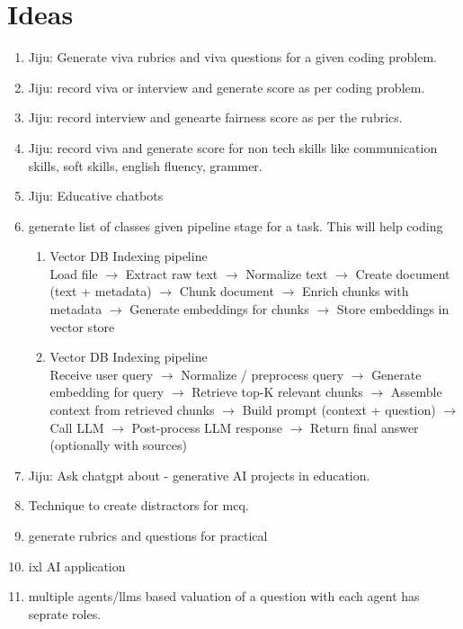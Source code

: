 \section{Ideas}
    \begin{enumerate}
        \item Jiju: Generate viva rubrics and viva questions for a given coding problem.
        \item Jiju: record viva or interview and generate score as per coding problem.
        \item Jiju: record interview and genearte fairness score as per the rubrics.
        \item Jiju: record viva and generate score for non tech skills like communication skills, soft skills, english fluency, grammer.
        \item Jiju: Educative chatbots
        \item generate list of classes given pipeline stage for a task. This will help coding
        \begin{enumerate}
            \item Vector DB Indexing pipeline\\
            Load file $\rightarrow$  Extract raw text $\rightarrow$  Normalize text $\rightarrow$  Create document (text + metadata) $\rightarrow$  Chunk document $\rightarrow$  Enrich chunks with metadata $\rightarrow$  Generate embeddings for chunks $\rightarrow$  Store embeddings in vector store 
            \item Vector DB Indexing pipeline\\
            Receive user query $\rightarrow$ Normalize / preprocess query $\rightarrow$ Generate embedding for query $\rightarrow$ Retrieve top-K relevant chunks $\rightarrow$ Assemble context from retrieved chunks $\rightarrow$ Build prompt (context + question) $\rightarrow$ Call LLM $\rightarrow$ Post-process LLM response $\rightarrow$ Return final answer (optionally with sources)
        \end{enumerate}
        \item Jiju: Ask chatgpt about - generative AI projects in education.
        \item Technique to create distractors for mcq. 
        \item generate rubrics and questions for practical
        \item ixl AI application
        \item multiple agents/llms based valuation of a question with each agent has seprate roles. 

\end{enumerate}
